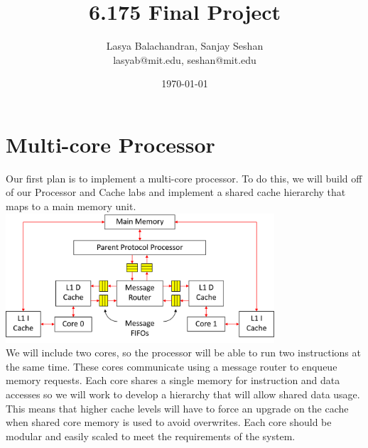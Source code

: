 \documentclass{article}
\title{6.175 Final Project}
\author{Lasya Balachandran, Sanjay Seshan\\lasyab@mit.edu, seshan@mit.edu}
\date{\today}
\begin{document}


\maketitle

\section{Multi-core Processor}
Our first plan is to implement a multi-core processor. To do this, we will build off of our Processor and Cache labs and implement a shared cache hierarchy that maps to a main memory unit.\\ 

\includegraphics[width=10cm]{system.png}\\

We will include two cores, so the processor will be able to run two instructions at the same time. 
These cores communicate using a message router to enqueue memory requests. Each core shares a single memory for instruction and data accesses so we will work to develop a hierarchy that will allow shared data usage. This means that higher cache levels will have to force an upgrade on the cache when shared core memory is used to avoid overwrites. Each core should be modular and easily scaled to meet the requirements of the system.
\end{document}
